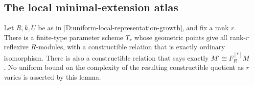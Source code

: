 \subsection{The local minimal-extension atlas}

\begin{lemma}
\label{D:local-reflexive-constructible-atlas}
Let \(R,k,U\) be as in
\ref{D:uniform-local-representation-growth}, and fix a rank \(r\).
There is a finite-type parameter scheme \(T_r\) whose geometric
points give all rank-\(r\) reflexive \(R\)-modules, with a
constructible relation that is exactly ordinary isomorphism.
There is also a constructible relation that says exactly
\(M'\cong F_R^{[*]}M\).
No uniform bound on the complexity of the resulting constructible
quotient as \(r\) varies is asserted by this lemma.
\end{lemma}


